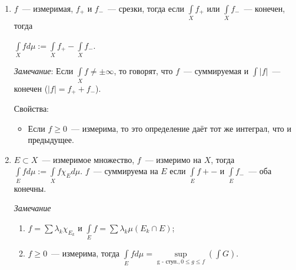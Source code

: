 \documentclass{article}
\begin{document}
        \begin{enumerate}
                
            \item $f$~--- измеримая, $f_+$ и $f_-$~--- срезки, тогда если $\int\limits_{X} f_+$ или $\int\limits_{X} f_-$~--- конечен, тогда 
            
                $\int\limits_{X} f d \mu := \int\limits_{X} f_+ - \int\limits_{X} f_-$. 
                
                \textit{Замечание}: Если $\int\limits_{X} f \neq \pm \infty$, то говорят, что $f$~--- суммируемая и $\int |f|$~--- конечен ($|f| = f_+ + f_-$).
                
                Свойства:
                
                \begin{itemize}
                
                    \item Если $f \geqslant 0$~--- измерима, то это определение даёт тот же интеграл, что и предыдущее.
                
                \end{itemize}
            
            \item $E \subset X$~--- измеримое множество, $f$~--- измеримо на $X$, тогда $\int\limits_{E} f d \mu := \int\limits_{X} f \chi_E d \mu$. $f$~--- суммируема на $E$ если $\int\limits_{E} f+-$ и $\int\limits_{E} f_-$~--- оба конечны.
            
                \textit{Замечание} 
                
                    \begin{enumerate}
                    
                        \item $f = \sum \lambda_k \chi_{E_k}$ и $\int\limits_{E} f = \sum \lambda_k \mu \left( E_k \cap E \right)$;
                
                        \item $f \geqslant 0$~--- измерима, тогда $\int\limits_{E} f d \mu = \sup\limits_{\text{g - ступ.}, 0 \leqslant g \leqslant f} \left( \int G \right)$.
                        
                    \end{enumerate}
                    
        \end{enumerate}
        
\end{document}
